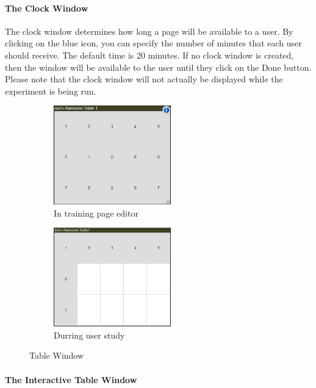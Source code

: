 \documentclass[article]{ij4uq}              %
\begin{document}
\paragraph{The Clock Window}
The clock window determines how long a page will be available to a user. By clicking on the blue icon, you can specify the number of minutes that each user should receive. The default time is 20 minutes. If no clock window is created, then the window will be available to the user until they click on the Done button. Please note that the clock window will not actually be displayed while the experiment is being run.

\begin{figure}[h!]
 \centering
 \begin{subfigure}[b]{0.4\textwidth}
    \centering
    \includegraphics[width=2.0in]{figures/table_uncovered.png}
    \caption{In training page editor}
    \label{fig:tableUN}
 \end{subfigure}
 \begin{subfigure}[b]{0.4\textwidth}
    \centering
    \includegraphics[width=2.0in]{figures/table_covered.png}
    \caption{Durring user study}
    \label{fig:tableCV}
 \end{subfigure}
 \caption{Table Window}
 \label{fig:tableWindow}
\end{figure}

\FloatBarrier

\paragraph{The Interactive Table Window}
\end{document}
